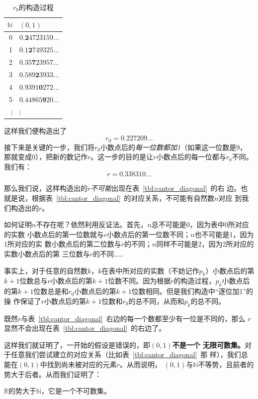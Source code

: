 \begin{table}[H]
    \centering
    \caption{$r_{0}$的构造过程}\label{tbl:cantor_diagonal_maker0}
    \begin{tabular}{r|l}
        $\mathbb{N}$& $\left( 0,1 \right) $\\
        \hline
        0 & $0.\mathbf{2}4723159\ldots $\\
        1 & $0.1\mathbf{2}749325\ldots $\\
        2 & $0.35\mathbf{7}23957\ldots $\\
        3 & $0.589\mathbf{2}3933\ldots $\\
        4 & $0.9391\mathbf{0}272\ldots $\\
        5 & $0.44865\mathbf{9}20\ldots $\\
        $\vdots$ & $\vdots$
    \end{tabular}
\end{table}

这样我们便构造出了
\[
    r_{0}=0.227209\ldots 
\]
接下来是关键的一步，我们将$r_{0}$小数点后的\emph{每一位数都加1}（如果这一位数是9，
那就变成0），把新的数记作$r$。这一步的目的是让$r$小数点后的每一位都与$r_{0}$不同。
我们有：
\[
    r=0.338310\ldots 
\]

那么我们说，这样构造出的$r$\emph{不可能}出现在表~\ref{tbl:cantor_diagonal}~的右
边。也就是说，根据表~\ref{tbl:cantor_diagonal}~的对应关系，不可能有自然数$n$对应
到我们构造出的$r$。

如何证明$n$不存在呢？依然利用反证法。首先，$n$总不可能是0，因为表中0所对应的实数
小数点后的第一位数就与$r$小数点后的第一位数不同；$n$也不可能是1，因为1所对应的实
数小数点后的第二位数与$r$的不同；$n$同样不可能是2，因为2所对应的实数小数点后的第
三位数与$r$的不同……

事实上，对于任意的自然数$k$，$k$在表中所对应的实数（不妨记作$p_k$）小数点后的第
$k+1$位数总与$r$小数点后的第$k+1$位数不同。因为根据$r$的构造过程，$p_k$小数点后
的第$k+1$位数总是和$r_{0}$小数点后的第$k+1$位数相同。但是我们构造中“逐位加1”的操
作保证了$r$小数点后的第$k+1$位数和$r_{0}$的总不同，从而和$p_k$的总不同。

既然$r$与表~\ref{tbl:cantor_diagonal}~右边的每一个数都至少有一位是不同的，那么
$r$显然不会出现在表~\ref{tbl:cantor_diagonal}~的右边了。

这样我们就证明了，一开始的假设是错误的，即\textbf{$\left( 0,1 \right) $不是一个
无限可数集。}对于任意我们尝试建立的对应关系（比如表~\ref{tbl:cantor_diagonal}~那
样），我们总能在$\left( 0,1 \right) $中找到尚未被对应的元素$r$。从而说明，
$\left( 0,1 \right) $与$\mathbb{N}$不等势，且前者的势大于后者。从而我们证明了：

\begin{rawthm}
    $\mathbb{R}$的势大于$\mathbb{N}$，它是一个不可数集。
\end{rawthm}
